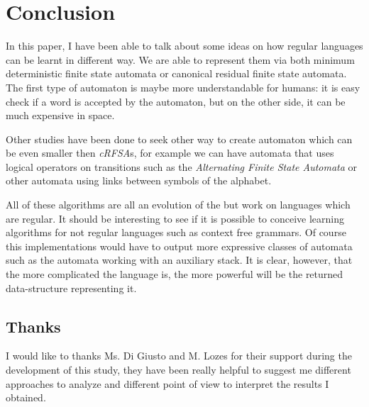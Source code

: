 \section{Conclusion}

In this paper, I have been able to talk about some ideas on how regular languages can be learnt in different way. We are able to represent them via both minimum deterministic finite state automata or canonical residual finite state automata. The first type of automaton is maybe more understandable for humans: it is easy check if a word is accepted by the automaton, but on the other side, it can be much expensive in space.

Other studies have been done to seek other way to create automaton which can be even smaller then \textit{cRFSA}s, for example we can have automata that uses logical operators on transitions such as the \textit{Alternating Finite State Automata} or other automata using links between symbols of the alphabet.

All of these algorithms are all an evolution of the \cite{LPaper} but work on languages which are regular. It should be interesting to see if it is possible to conceive learning algorithms for not regular languages such as context free grammars. Of course this implementations would have to output more expressive classes of automata such as the automata working with an auxiliary stack. It is clear, however, that the more complicated the language is, the more powerful will be the returned data-structure representing it.


\subsection{Thanks}
I would like to thanks Ms. Di Giusto and M. Lozes for their support during the development of this study, they have been really helpful to suggest me different approaches to analyze and different point of view to interpret the results I obtained.